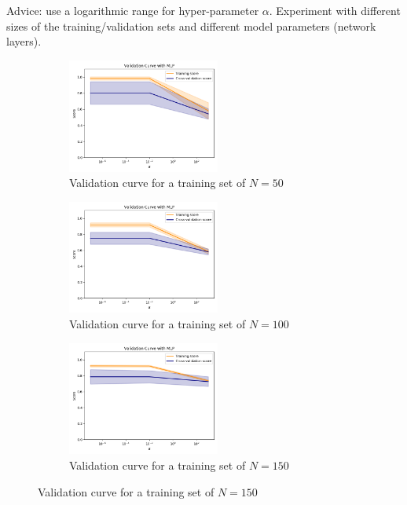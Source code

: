 \documentclass[12pt,letterpaper]{article}
\begin{document}
Advice: use a logarithmic range for hyper-parameter $\alpha$. Experiment with different sizes of the training/validation sets and different model parameters (network layers).

\begin{figure}[H]
    \begin{subfigure}{0.3\textwidth}
    \includegraphics[width=5cm]{images/validationcurve_50.jpg} 
    \caption{Validation curve for a training set of $N=50$}
    \label{fig:subfig5}
    \end{subfigure}
    \begin{subfigure}{0.3\textwidth}
    \includegraphics[width=5cm]{images/validationcurve_100.jpg}
    \caption{Validation curve for a training set of $N=100$}
    \label{fig:subfiig6}
    \end{subfigure}
    \begin{subfigure}{0.3\textwidth}
    \includegraphics[width=5cm]{images/validationcurve_150.jpg}
    \caption{Validation curve for a training set of $N=150$}
    \label{fig:subfiig7}
    \end{subfigure}
    

\end{figure}
\end{document}
